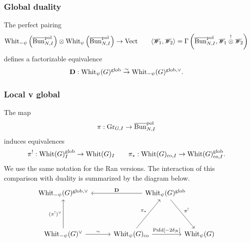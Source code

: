 \subsubsection{Global duality} The perfect pairing
    \[
    \mathrm{Whit}_{-\psi}\left( \overline{\mathrm{Bun}}_{N,I}^{\mathrm{pol}} \right) \otimes \mathrm{Whit}_{\psi}\left( \overline{\mathrm{Bun}}_{N,I}^{\mathrm{pol}} \right) \to \mathrm{Vect}
    \qquad \langle \mathscr{W}_1, \mathscr{W}_2 \rangle = \Gamma\left( \overline{\mathrm{Bun}}_{N,I}^{\mathrm{pol}}, \mathscr{W}_1 \overset{!}{\otimes} \mathscr{W}_2 \right)\]
defines a factorizable equivalence
  \[\mathbf{D} : \mathrm{Whit}_{\psi}(G)^{\mathrm{glob}} \overset{\sim}{\rightarrow} \mathrm{Whit}_{-\psi}(G)^{\mathrm{glob},\vee}.\]

\subsubsection{Local v global} The map
    \[\pi : \mathrm{Gr}_{G,I} \to \overline{\mathrm{Bun}}_{N,I}^{\mathrm{pol}}\]
induces equivalences
    \[
        \pi^! : \mathrm{Whit}(G)_I^{\mathrm{glob}} \to \mathrm{Whit}(G)_I  \qquad
        \pi_* : \mathrm{Whit}(G)_{\mathrm{co},I} \to \mathrm{Whit}(G)_{\mathrm{co}, I}^{\mathrm{glob}}.
    \]
We use the same notation for the Ran versions. The interaction of this comparison with duality is summarized by the diagram below.
\begin{equation}
\label{eqn:Whit_duality_loc_global}
\begin{tikzcd}[
      column sep={5em,between origins},
      row sep={6em,between origins}
    ]
    \Whit_{-\psi}(G)^{\glob,\vee} & & & \Whit_\psi(G)^\glob \arrow[lll, "\DD" above] \arrow[dr, "\pi^!"] & \\
    \Whit_{-\psi}(G)^\vee \arrow[rr, "\sim"] \arrow[u, "(\pi^!)^\vee"] & & \Whit_\psi(G)_\co \arrow[rr, "\PsId{[-2 \delta_N]}"] \arrow[ur, "\pi_*"] & & \Whit_\psi(G)
\end{tikzcd}
\end{equation}

